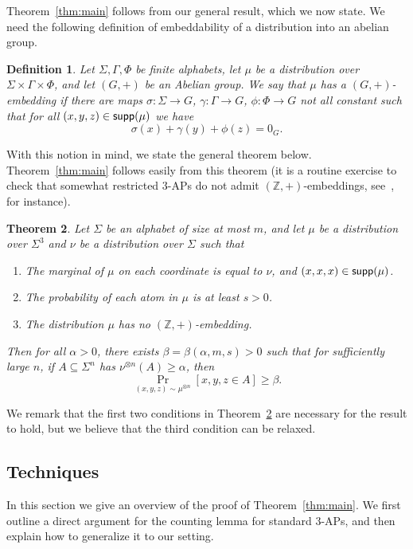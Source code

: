 \documentclass[11pt]{article}
\newtheorem{thm}{Theorem}[section]
\newtheorem{definition}[thm]{Definition}
\newcommand\Prob[2]{{\Pr_{#1}\left[ {#2} \right]}}
\renewcommand\geq{\geqslant}
\begin{document}
Theorem~\ref{thm:main} follows from our general result, which we now state. We need the following definition of embeddability of a distribution into an abelian group.
\begin{definition}
    Let $\Sigma,\Gamma,\Phi$ be finite alphabets, let $\mu$ be a distribution over $\Sigma\times\Gamma\times\Phi$, and let $(G,+)$ be an Abelian group. We say that $\mu$ has a $(G,+)$-embedding if there are maps $\sigma\colon \Sigma\to G$, $\gamma\colon \Gamma\to G$, $\phi\colon \Phi\to G$ not all constant such that for all $(x,y,z)\in{\sf supp}(\mu)$ we have
    \[
    \sigma(x)+\gamma(y)+\phi(z) = 0_G.
    \]
\end{definition}
With this notion in mind, we state the general theorem below.  Theorem~\ref{thm:main} follows easily from this theorem (it is a routine exercise to check that somewhat restricted $3$-APs do not admit $(\mathbb{Z},+)$-embeddings, see~\cite{BKM3AP}, for instance).

\begin{thm}\label{thm:main_2}
    Let $\Sigma$ be an alphabet of size at most $m$, and let $\mu$ be a distribution over $\Sigma^3$ and $\nu$ be a distribution over $\Sigma$ such that 
    \begin{enumerate}
        \item The marginal of $\mu$ on each coordinate is equal to $\nu$, and $(x,x,x)\in {\sf supp}(\mu)$.
        \item The probability of each atom in $\mu$ is at least $s>0$.
        \item The distribution $\mu$ has no $(\mathbb{Z},+)$-embedding.
    \end{enumerate}
    Then for all $\alpha>0$, there exists $\beta = \beta(\alpha,m,s)>0$ such that for sufficiently large $n$, if $A\subseteq \Sigma^n$ has 
    $\nu^{\otimes n}(A)\geq \alpha$, then
    \[
    \Prob{(x,y,z)\sim\mu^{\otimes n}}{x,y,z\in A}\geq \beta.
    \]
\end{thm}
We remark that the first two conditions in Theorem~\ref{thm:main_2} are necessary for the result to hold, but we believe that the third condition can be relaxed.

\subsection{Techniques}\label{sec:techniques}
In this section we give an overview of the proof of Theorem~\ref{thm:main}. We first outline a direct argument for the counting lemma for standard $3$-APs, and then explain how to generalize it to our setting.
\end{document}
